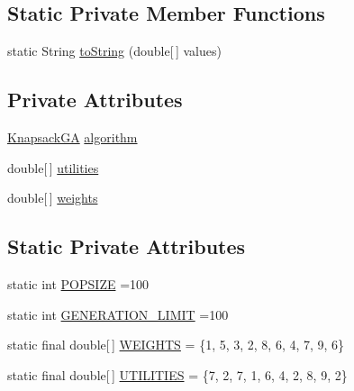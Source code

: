 \subsection*{Static Private Member Functions}
\begin{DoxyCompactItemize}
\item 
static String \hyperlink{classjenes_1_1tutorials_1_1problem6_1_1_knapsack_problem_aae8373d29def494dd9bbf86c729a5336}{to\-String} (double\mbox{[}$\,$\mbox{]} values)
\end{DoxyCompactItemize}
\subsection*{Private Attributes}
\begin{DoxyCompactItemize}
\item 
\hyperlink{classjenes_1_1tutorials_1_1problem6_1_1_knapsack_g_a}{Knapsack\-G\-A} \hyperlink{classjenes_1_1tutorials_1_1problem6_1_1_knapsack_problem_a4a10c09e3ae2ffc56a67b59f57767189}{algorithm}
\item 
double\mbox{[}$\,$\mbox{]} \hyperlink{classjenes_1_1tutorials_1_1problem6_1_1_knapsack_problem_acad1c415f8d164b4ffa0d99db5fc6772}{utilities}
\item 
double\mbox{[}$\,$\mbox{]} \hyperlink{classjenes_1_1tutorials_1_1problem6_1_1_knapsack_problem_a1c7f18379c5ca910013fc02748a53bf9}{weights}
\end{DoxyCompactItemize}
\subsection*{Static Private Attributes}
\begin{DoxyCompactItemize}
\item 
static int \hyperlink{classjenes_1_1tutorials_1_1problem6_1_1_knapsack_problem_a138e3d34c9168d33b53f3bb67e2207d7}{P\-O\-P\-S\-I\-Z\-E} =100
\item 
static int \hyperlink{classjenes_1_1tutorials_1_1problem6_1_1_knapsack_problem_a594ddc19149baf7d1c8c7487c85a4ed5}{G\-E\-N\-E\-R\-A\-T\-I\-O\-N\-\_\-\-L\-I\-M\-I\-T} =100
\item 
static final double\mbox{[}$\,$\mbox{]} \hyperlink{classjenes_1_1tutorials_1_1problem6_1_1_knapsack_problem_a7dfea169d398ccf63ee9cb6dae89752b}{W\-E\-I\-G\-H\-T\-S} = \{1, 5, 3, 2, 8, 6, 4, 7, 9, 6\}
\item 
static final double\mbox{[}$\,$\mbox{]} \hyperlink{classjenes_1_1tutorials_1_1problem6_1_1_knapsack_problem_ac49eb8a17fa93f76613151b296c23567}{U\-T\-I\-L\-I\-T\-I\-E\-S} = \{7, 2, 7, 1, 6, 4, 2, 8, 9, 2\}
\end{DoxyCompactItemize}


